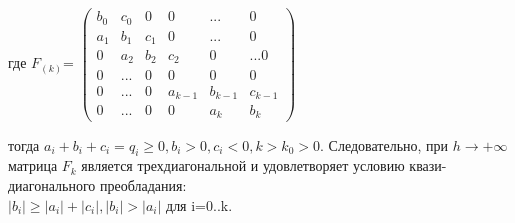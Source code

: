 \documentclass[__main__.tex]{subfiles}
\begin{document}
 где 
$ F_{(k)}$=
 $\left(
 \begin{matrix}
 	b_{0} & c_{0} & 0 & 0 & ... & 0\\
 	a_{1}&b_{1}&c_{1} & 0& ...&0\\
 	0&a_{2}&b_{2}&c_{2}&0&...0\\
 	0&...&0&0&0&0\\
 	0&...&0&a_{k-1}&b_{k-1}&c_{k-1}\\
 	0&...&0&0&a_{k}&b_{k}	
 \end{matrix}
 \right)$
 
 тогда $a_{i}+b_{i}+c_{i}=q_{i}\geq0, b_{i}>0,c_{i}<0, k>k_{0}>0$. Следовательно, при $h\to+\infty$ матрица $F_{k}$ является трехдиагональной и удовлетворяет условию квази-диагонального преобладания:\\
 $|b_{i}|\geq|a_{i}|+|c_{i}|,|b_{i}|>|a_{i}|$ для i=0..k.
 
\end{document}
